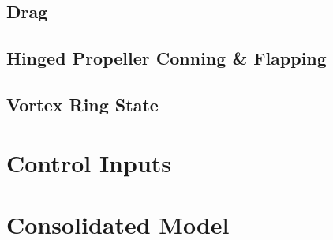\subsection{Drag}
\label{subsec:dynamics.aero.drag}
\subsection{Hinged Propeller Conning \& Flapping}
\label{subsec:dynamics.aero.flap}
\subsection{Vortex Ring State}
\label{subsec:dynamics.aero.vrs}
\section{Control Inputs}
\section{Consolidated Model}
\label{sec:dynamics.model}%